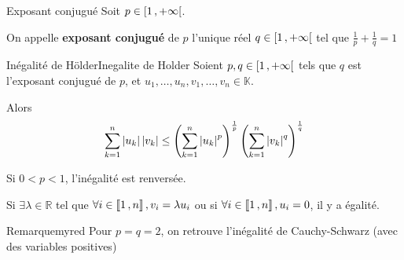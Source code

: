     \begin{defi}{Exposant conjugué}{}
        Soit $p \in \left[ 1 \, , + \infty \right[$. 

        On appelle \textbf{exposant conjugué} de $p$ l’unique réel $q \in \left[ 1 \, , + \infty \right[$ tel que $\frac{1}{p} + \frac{1}{q} = 1$
    \end{defi}

    \begin{theo}{Inégalité de Hölder}{Inegalite de Holder}
        Soient $p,q \in \left[ 1 \, , + \infty \right[$ tels que $q$ est l’exposant conjugué de $p$, et $u_1,\ldots,u_n,v_1,\ldots,v_n \in \mathbb{K}$.
        
        Alors \[ \sum\limits_{k=1}^n \left\lvert u_k\right\rvert \left\lvert v_k\right\rvert \leq \left(\sum\limits_{k=1}^n \left\lvert u_k\right\rvert^p\right)^{\frac{1}{p}} \left(\sum\limits_{k=1}^n  \left\lvert v_k\right\rvert^q\right)^{\frac{1}{q}} \]
        
        Si $ 0 < p < 1$, l’inégalité est renversée. 

        Si $\exists \lambda \in \mathbb{R}$ tel que $\forall i \in \left\llbracket 1 \, , n \right\rrbracket, v_i = \lambda u_i$ ou si $\forall i \in \left\llbracket 1 \, , n \right\rrbracket, u_i = 0$, il y a égalité.
    \end{theo}

    \begin{omed}{Remarque}{myred}
        Pour $p = q = 2$, on retrouve l’inégalité de Cauchy-Schwarz (avec des variables positives)
    \end{omed}


